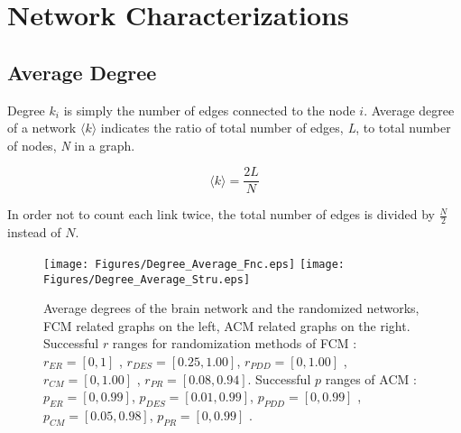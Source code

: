 
\chapter{Network Characterizations} %

\label{AppendixB} %


\section{Average Degree}

Degree $k_i$ is simply the number of edges connected to the node $i$. Average degree of a network $\langle k \rangle$ indicates the ratio of total number of edges, \textit{L}, to total number of nodes, \textit{N} in a graph.
 
\begin{equation}
\langle k \rangle = \frac{2L}{N}
\end{equation} 
 
In order not to count each link twice, the total number of edges is divided by $\frac{N}{2}$ instead of $N$. 
 

%
%
% 
%
%
%
%
% 
%



\begin{figure}[htbp]
 
  \centering
	 \texttt{[image: Figures/Degree\_Average\_Fnc.eps]}
	 \texttt{[image: Figures/Degree\_Average\_Stru.eps]}
  \caption[Average Degree]{Average degrees of the brain network and the randomized networks, FCM related graphs on the left, ACM related graphs on the right. Successful $r$ ranges for randomization methods of FCM :  $r_{ER}=[0,1]$ , $r_{DES} = [0.25,1.00]$, $r_{PDD} = [0,1.00]$ , $r_{CM} = [0,1.00]$ , $r_{PR} = [0.08,0.94]$. Successful $p$ ranges of ACM : $p_{ER}=[0,0.99]$, $p_{DES}=[0.01 , 0.99]$, $p_{PDD}=[0, 0.99]$ , $p_{CM}=[0.05 , 0.98]$, $p_{PR} = [0,0.99]$ .} 
    \label{fig:Average Degree}
 	
\end{figure}  


